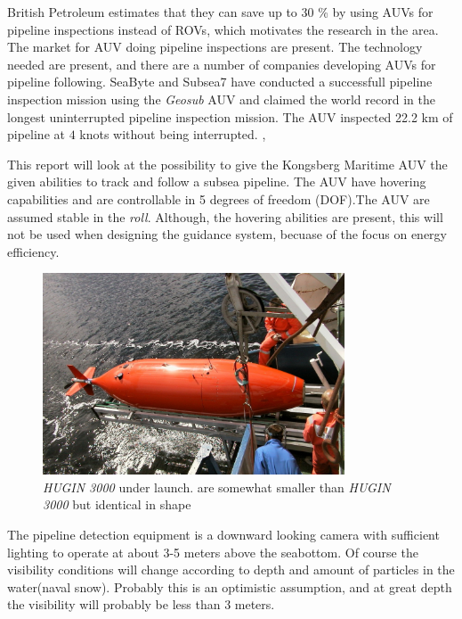 	British Petroleum estimates that they can save up to 30 \% by using AUVs for pipeline inspections
	instead of ROVs, which motivates the research in the area. The market for AUV doing pipeline
	inspections are present. The technology needed are present, and there are a number of companies developing
	AUVs for pipeline following. SeaByte and Subsea7 have conducted a successfull pipeline inspection
	mission using the \textit{Geosub} AUV and claimed the world record in the longest uninterrupted
	pipeline inspection mission. The AUV inspected 22.2 km of pipeline at $4$ knots without being
	interrupted. \cite{Seabyte}, \cite{PhD_lecture}
	
	This report will look at the possibility to give the Kongsberg Maritime \hugin AUV the
	given abilities to track and follow a subsea pipeline. The AUV have hovering capabilities and are
	controllable in 5 degrees of freedom (DOF).The AUV are assumed stable in the \textit{roll}.
	Although, the hovering abilities are present, this will not be used when designing the guidance
	system, becuase of the focus on energy efficiency.

	\begin{figure}[htbp]
		\centering
		\includegraphics[width=0.8\textwidth]{pics/hugin3000}
		\caption{\textit{HUGIN 3000} under launch. \hugin are somewhat smaller than \textit{HUGIN
		3000} but identical in shape}
	\end{figure}

	The pipeline detection equipment is a downward looking camera with sufficient lighting to operate at about
	3-5 meters above the seabottom. Of course the visibility conditions will change according to depth and
	amount of particles in the water(naval snow). Probably this is an optimistic assumption, and at great
	depth the visibility will probably be less than 3 meters.

